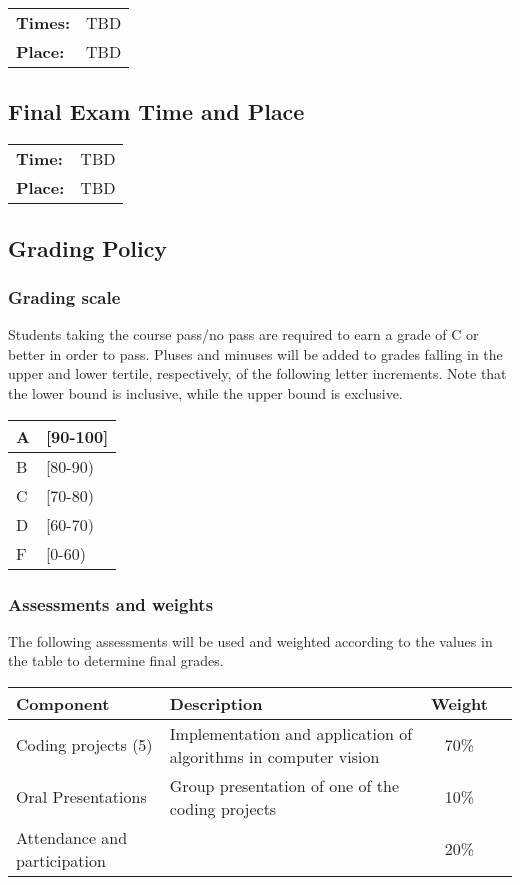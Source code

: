 \documentclass[12pt,letterpaper]{scrartcl}
\begin{document}
\begin{tabular}{l l}
\textbf{Times:} & TBD\\
\textbf {Place:} & TBD\\
\end{tabular}

\subsection*{Final Exam Time and Place}

\begin{tabular}{l l}
\textbf{Time:} & TBD \\ 
\textbf {Place:} & TBD\\
\end{tabular}
\subsection*{Grading Policy}

\subsubsection*{Grading scale}
Students taking the course pass/no pass are required to earn a grade of C or better in order to pass.  Pluses and minuses will be added to grades falling in the upper and lower tertile, respectively, of the following letter increments.  Note that the lower bound is inclusive, while the upper bound is exclusive.\\
\begin{tabular}{|l|l|}
\hline
A & [90-100]\\
\hline
B & [80-90) \\
\hline
C & [70-80) \\
\hline
D & [60-70) \\
\hline
F & [0-60) \\
\hline
\end{tabular}

\subsubsection*{Assessments and weights}
The following assessments will be used and weighted according to the values in the table to determine final grades.

\begin{center}
\begin{tabular}{|p{3cm}|p{10cm}|c|c|}
\hline
\textbf{Component} &\textbf{Description} &  \textbf{Weight}\\
\hline
\hline
Coding projects (5) & Implementation and application of algorithms in computer vision & 70\% \\ \hline
Oral Presentations & Group presentation of one of the coding projects & 10\% \\ \hline
Attendance and participation &  & 20\% \\ \hline
\hline
\end{tabular}
\end{center}
\end{document}
